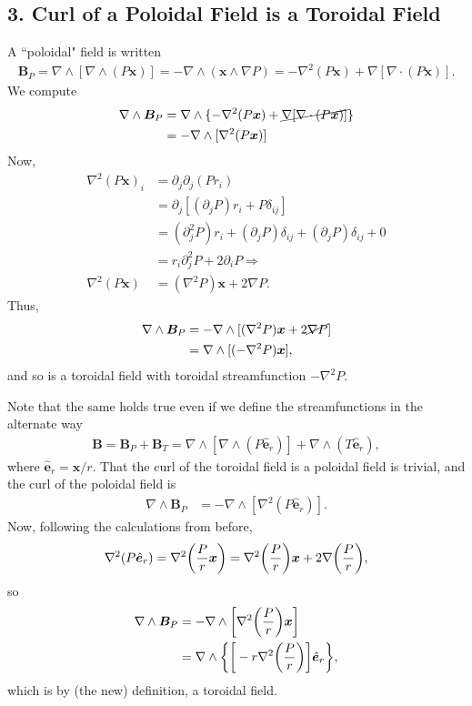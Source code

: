 \documentclass[12pt]{article} %
\newcommand{\e}{\hat{\bm{e}}}
\begin{document}
\subsection*{3. Curl of a Poloidal Field is a Toroidal Field}
A ``poloidal" field is written
\begin{align*}
\bm{B}_P = \nabla\wedge[\nabla\wedge(P\bm{x})] = -\nabla \wedge(\bm{x}\wedge\nabla P) = -\nabla^2(P\bm{x}) + \nabla[\nabla\cdot(P\bm{x})].
\end{align*}
We compute
\begin{align*}
\nabla\wedge \bm{B}_P &= \nabla\wedge\{ -\nabla^2(P\bm{x}) + \cancel{\nabla[\nabla\cdot(P\bm{x})]}\}\\
&= - \nabla\wedge[\nabla^2(P\bm{x})]
\end{align*}
Now, 
\begin{align*}
\nabla^2(P\bm{x})_i &= \partial_j\partial_j(Pr_i)\\
&= \partial_j[(\partial_jP)r_i + P\delta_{ij}]\\
&= (\partial_j^2P)r_i + (\partial_jP)\delta_{ij} + (\partial_jP)\delta_{ij} + 0\\
&= r_i\partial_j^2P + 2\partial_iP\Longrightarrow\\
\nabla^2(P\bm{x}) &= (\nabla^2P)\bm{x} + 2\nabla P.
\end{align*}
Thus,
\begin{align*}
\nabla\wedge \bm{B}_P &= - \nabla\wedge[(\nabla^2P)\bm{x} + 2\cancel{\nabla P}]\\
&= \nabla\wedge[(-\nabla^2P)\bm{x}],
\end{align*}
and so is a toroidal field with toroidal streamfunction $-\nabla^2P$. 

Note that the same holds true even if we define the streamfunctions in the alternate way
\begin{align*}
\bm{B} = \bm{B}_P + \bm{B}_T = \nabla\wedge[\nabla\wedge(P\e_r)] + \nabla\wedge(T\e_r),
\end{align*}
where $\e_r = \bm{x}/r$. That the curl of the toroidal field is a poloidal field is trivial, and the curl of the poloidal field is
\begin{align*}
\nabla\wedge\bm{B}_P &= -\nabla\wedge[\nabla^2(P\e_r)].
\end{align*}
Now, following the calculations from before,
\begin{align*}
\nabla^2(P\e_r) = \nabla^2\bigg{(}\frac{P}{r}\bm{x}\bigg{)} = \nabla^2\bigg{(}\frac{P}{r}\bigg{)}\bm{x} + 2\nabla\bigg{(}\frac{P}{r}\bigg{)},
\end{align*}
so
\begin{align*}
\nabla\wedge\bm{B}_P &= -\nabla\wedge\bigg{[}\nabla^2\bigg{(}\frac{P}{r}\bigg{)}\bm{x}\bigg{]}\\
&= \nabla\wedge\bigg{\{}\bigg{[}-r\nabla^2\bigg{(}\frac{P}{r}\bigg{)}\bigg{]}\e_r\bigg{\}},
\end{align*}
which is by (the new) definition, a toroidal field. 
\end{document}
